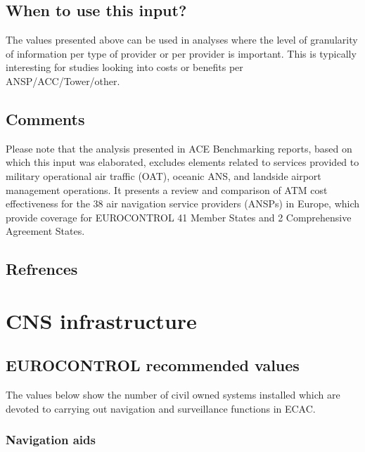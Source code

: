 \documentclass[
  11pt,
  a4paper,
]{book}
\begin{document}
\hypertarget{when-to-use-this-input}{%
\section{When to use this input?}\label{when-to-use-this-input}}

The values presented above can be used in analyses where the level of
granularity of information per type of provider or per provider is
important. This is typically interesting for studies looking into costs
or benefits per ANSP/ACC/Tower/other.

\hypertarget{comments-10}{%
\section{Comments}\label{comments-10}}

Please note that the analysis presented in ACE Benchmarking reports,
based on which this input was elaborated, excludes elements related to
services provided to military operational air traffic (OAT), oceanic
ANS, and landside airport management operations. It presents a review
and comparison of ATM cost effectiveness for the 38 air navigation
service providers (ANSPs) in Europe, which provide coverage for
EUROCONTROL 41 Member States and 2 Comprehensive Agreement States.

\hypertarget{refrences-1}{%
\section{Refrences}\label{refrences-1}}

\hypertarget{sec-cns-infrastructure}{%
\chapter{CNS infrastructure}\label{sec-cns-infrastructure}}

\hypertarget{eurocontrol-recommended-values-30}{%
\section{EUROCONTROL recommended
values}\label{eurocontrol-recommended-values-30}}

The values below show the number of civil owned systems installed which
are devoted to carrying out navigation and surveillance functions in
ECAC.

\hypertarget{navigation-aids}{%
\subsection{Navigation aids}\label{navigation-aids}}
\end{document}
